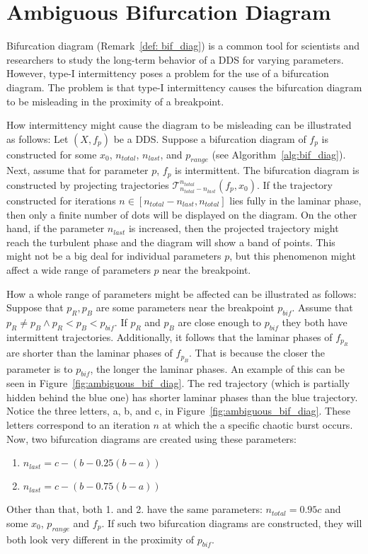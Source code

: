\section{Ambiguous Bifurcation Diagram}
\label{sec:ambiguous_bif_diag}
Bifurcation diagram (Remark~\ref{def: bif_diag}) is a common tool for scientists and researchers to study the long-term behavior of a DDS for varying parameters.
However, type-I intermittency poses a problem for the use of a bifurcation diagram.
The problem is that type-I intermittency causes the bifurcation diagram to be misleading in the proximity of a breakpoint.
\par
How intermittency might cause the diagram to be misleading can be illustrated as follows:
Let $(X, f_{p})$ be a DDS.
Suppose a bifurcation diagram of $f_{p}$ is constructed for some $x_0$, $n_{total}$, $n_{last}$, and $p_{range}$ (see Algorithm~\ref{alg:bif_diag}).
Next, assume that for parameter $p$, $f_{p}$ is intermittent.
The bifurcation diagram is constructed by projecting trajectories $\mathcal{T}_{n_{total}-n_{last}}^{n_{total}}(f_{p}, x_0)$.
If the trajectory constructed for iterations $n \in [n_{total}-n_{last}, n_{total}]$ lies fully in the laminar phase, then only a finite number of dots will be displayed on the diagram.
On the other hand, if the parameter $n_{last}$ is increased, then the projected trajectory might reach the turbulent phase and the diagram will show a band of points.
This might not be a big deal for individual parameters $p$, but this phenomenon might affect a wide range of parameters $p$ near the breakpoint.
\par
How a whole range of parameters might be affected can be illustrated as follows:
Suppose that $p_{R}, p_{B}$ are some parameters near the breakpoint $p_{bif}$.
Assume that $p_{R} \neq p_{B} \wedge p_{R} < p_{B} < p_{bif}$.
If $p_{R}$ and $p_{B}$ are close enough to $p_{bif}$ they both have intermittent trajectories.
Additionally, it follows that the laminar phases of $f_{p_{R}}$ are shorter than the laminar phases of $f_{p_{B}}$.
That is because the closer the parameter is to $p_{bif}$, the longer the laminar phases.
An example of this can be seen in Figure~\ref{fig:ambiguous_bif_diag}.
The red trajectory (which is partially hidden behind the blue one) has shorter laminar phases than the blue trajectory.
Notice the three letters, a, b, and c, in Figure~\ref{fig:ambiguous_bif_diag}.
These letters correspond to an iteration $n$ at which the a specific chaotic burst occurs.
Now, two bifurcation diagrams are created using these parameters:
\begin{enumerate}
    \item $n_{last} = c-(b-0.25(b-a))$
    \item $n_{last} = c-(b-0.75(b-a))$
\end{enumerate}
Other than that, both 1. and 2. have the same parameters: $n_{total} = 0.95c$ and some $x_0$, $p_{range}$ and $f_{p}$.
If such two bifurcation diagrams are constructed, they will both look very different in the proximity of $p_{bif}$.

